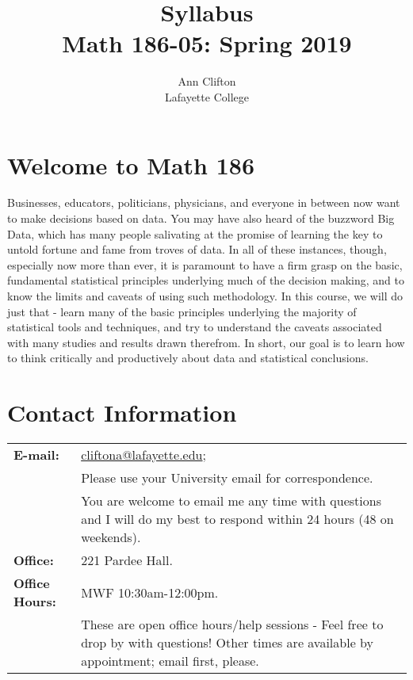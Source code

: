\documentclass[10pt]{amsart}
\author{Ann Clifton\\Lafayette College}
\title{Syllabus\\Math 186-05: Spring 2019}
\begin{document}
\maketitle

\section*{Welcome to Math 186}
Businesses, educators, politicians, physicians, and everyone in between now want to make decisions based on data.  You may have also heard of the buzzword Big Data, which has many people salivating at the promise of learning the key to untold fortune and fame from troves of data.  In all of these instances, though, especially now more than ever, it is paramount to have a firm grasp on the basic, fundamental statistical principles underlying much of the decision making, and to know the limits and caveats of using such methodology.  In this course, we will do just that - learn many of the basic principles underlying the majority of statistical tools and techniques, and try to understand the caveats associated with many studies and results drawn therefrom.  In short, our goal is to learn how to think critically and productively about data and statistical conclusions.

\section*{Contact Information}
\noindent
\begin{tabular}{p{1.4in}p{5in}}
  {\bf E-mail:} &\href{mailto:cliftona@lafayette.edu}{cliftona@lafayette.edu};\\ & Please use your University email for correspondence.\\
  & You are welcome to email me any time with questions and I will do my best to respond within 24 hours (48 on weekends).\\
  {\bf Office:} & 221 Pardee Hall.\\
  {\bf Office Hours:} & MWF 10:30am-12:00pm.\\
  & These are open office hours/help sessions - Feel free to drop by with questions!  Other times are available by appointment; email first, please.\\
  \end{tabular}
\end{document}

